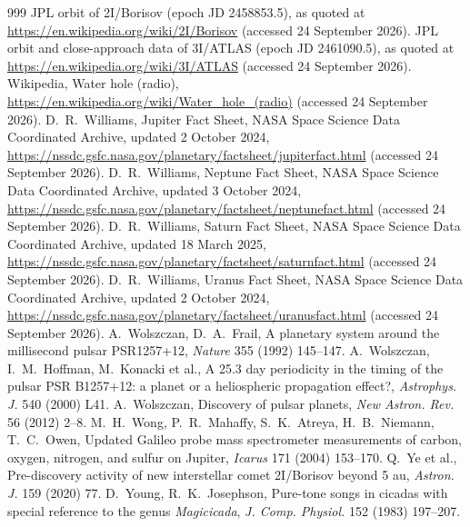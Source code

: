 \documentclass[11pt]{article}
\theoremstyle{definition}\newtheorem{definition}[theorem]{Definition}
\theoremstyle{remark}\newtheorem{remark}[theorem]{Remark}
\begin{document}
\begin{thebibliography}{999}
 JPL orbit of 2I/Borisov (epoch JD 2458853.5), as quoted at \url{https://en.wikipedia.org/wiki/2I/Borisov} (accessed 24 September 2026).
 JPL orbit and close-approach data of 3I/ATLAS (epoch JD 2461090.5), as quoted at \url{https://en.wikipedia.org/wiki/3I/ATLAS} (accessed 24 September 2026).
 Wikipedia, Water hole (radio), \url{https://en.wikipedia.org/wiki/Water_hole_(radio)} (accessed 24 September 2026).
 D.~R.~Williams, Jupiter Fact Sheet, NASA Space Science Data Coordinated Archive, updated 2 October 2024, \url{https://nssdc.gsfc.nasa.gov/planetary/factsheet/jupiterfact.html} (accessed 24 September 2026).
 D.~R.~Williams, Neptune Fact Sheet, NASA Space Science Data Coordinated Archive, updated 3 October 2024, \url{https://nssdc.gsfc.nasa.gov/planetary/factsheet/neptunefact.html} (accessed 24 September 2026).
 D.~R.~Williams, Saturn Fact Sheet, NASA Space Science Data Coordinated Archive, updated 18 March 2025, \url{https://nssdc.gsfc.nasa.gov/planetary/factsheet/saturnfact.html} (accessed 24 September 2026).
 D.~R.~Williams, Uranus Fact Sheet, NASA Space Science Data Coordinated Archive, updated 2 October 2024, \url{https://nssdc.gsfc.nasa.gov/planetary/factsheet/uranusfact.html} (accessed 24 September 2026).
 A.~Wolszczan, D.~A.~Frail, A planetary system around the millisecond pulsar PSR1257+12, \emph{Nature} 355 (1992) 145--147.
 A.~Wolszczan, I.~M.~Hoffman, M.~Konacki et al., A 25.3 day periodicity in the timing of the pulsar PSR B1257+12: a planet or a heliospheric propagation effect?, \emph{Astrophys. J.} 540 (2000) L41.
 A.~Wolszczan, Discovery of pulsar planets, \emph{New Astron. Rev.} 56 (2012) 2--8.
 M.~H.~Wong, P.~R.~Mahaffy, S.~K.~Atreya, H.~B.~Niemann, T.~C.~Owen, Updated Galileo probe mass spectrometer measurements of carbon, oxygen, nitrogen, and sulfur on Jupiter, \emph{Icarus} 171 (2004) 153--170.
 Q.~Ye et al., Pre-discovery activity of new interstellar comet 2I/Borisov beyond 5 au, \emph{Astron. J.} 159 (2020) 77.
 D.~Young, R.~K.~Josephson, Pure-tone songs in cicadas with special reference to the genus \emph{Magicicada}, \emph{J. Comp. Physiol.} 152 (1983) 197--207.
\end{thebibliography}
\end{document}
